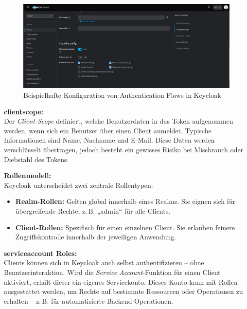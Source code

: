 \documentclass[a4paper,12pt]{article}
\begin{document}
	\begin{figure}[H]
		\centering
		\includegraphics[width=0.9\linewidth]{Bilder/screenshot013}
		\caption{Beispielhafte Konfiguration von Authentication Flows in Keycloak}
		\label{fig:screenshot013}
	\end{figure}
	
	\vspace{0.5em}
	\textbf{\gls{clientscope}:}\\
	Der \textit{Client-Scope} definiert, welche Benutzerdaten in das Token aufgenommen werden, wenn sich ein Benutzer über einen Client anmeldet. Typische Informationen sind Name, Nachname und E-Mail. Diese Daten werden verschlüsselt übertragen, jedoch besteht ein gewisses Risiko bei Missbrauch oder Diebstahl des Tokens.
	
	\vspace{0.5em}
	\textbf{Rollenmodell:}\\
	Keycloak unterscheidet zwei zentrale Rollentypen:
	
	\begin{itemize}
		\item \textbf{Realm-Rollen:} Gelten global innerhalb eines Realms. Sie eignen sich für übergreifende Rechte, z.\,B. „admin“ für alle Clients.
		\item \textbf{Client-Rollen:} Spezifisch für einen einzelnen Client. Sie erlauben feinere Zugriffskontrolle innerhalb der jeweiligen Anwendung.
	\end{itemize}
	
	\vspace{0.5em}
	\textbf{\gls{serviceaccount} Roles:}\\
	Clients können sich in Keycloak auch selbst authentifizieren – ohne Benutzerinteraktion. Wird die \textit{Service Account}-Funktion für einen Client aktiviert, erhält dieser ein eigenes Servicekonto. Dieses Konto kann mit Rollen ausgestattet werden, um Rechte auf bestimmte Ressourcen oder Operationen zu erhalten – z.\,B. für automatisierte Backend-Operationen.
	
\end{document}
